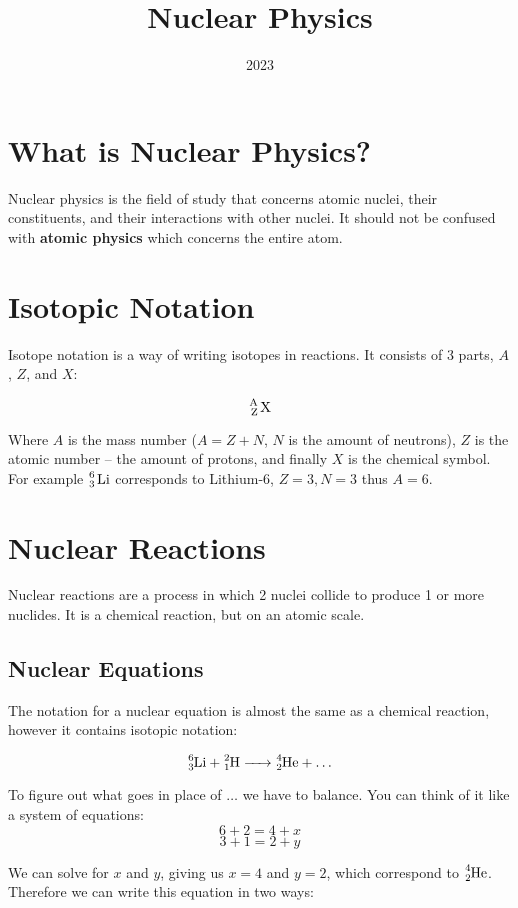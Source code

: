 \documentclass{article}
\title{Nuclear Physics}
\author{}
\date{2023}
\begin{document}
  \maketitle
  \tableofcontents

  \newpage
  
  \newpage
  \begin{multicols*}{2}
    \section{What is Nuclear Physics?}
    Nuclear physics is the field of study that concerns atomic nuclei,
    their constituents, and their interactions with other nuclei. It
    should not be confused with \textbf{atomic physics} which concerns
    the entire atom.

    \section{Isotopic Notation}
    Isotope notation is a way of writing isotopes in reactions. It consists
    of 3 parts, $A$, $Z$, and $X$:

    \[
      \ce{^A_Z X}
    \]

    Where $A$ is the mass number ($A = Z + N$, $N$ is the amount of neutrons),
    $Z$ is the atomic number -- the amount of protons, and finally $X$ is
    the chemical symbol. For example $\ce{^6_3 Li}$ corresponds to Lithium-$6$,
    $Z=3, N=3$ thus $A=6$. 
    \section{Nuclear Reactions}
    Nuclear reactions are a process in which 2 nuclei collide to produce 1 or 
    more nuclides. It is a chemical reaction, but on an atomic scale.

    \subsection{Nuclear Equations}
    The notation for a nuclear equation is almost the same as a chemical reaction,
    however it contains isotopic notation:

    \[
      \ce{^6_3Li + ^2_1H -> ^4_2He + \ldots}
    \]

    To figure out what goes in place of $\ldots$ we have to balance. You can think
    of it like a system of equations: 
    \[6+2 = 4+x\]
    \[3+1 = 2+y\]

    We can solve for $x$ and $y$, giving us $x=4$ and $y=2$, which correspond to
    $\ce{^4_2He}$. Therefore we can write this equation in two ways:


\end{multicols*}
\end{document}

